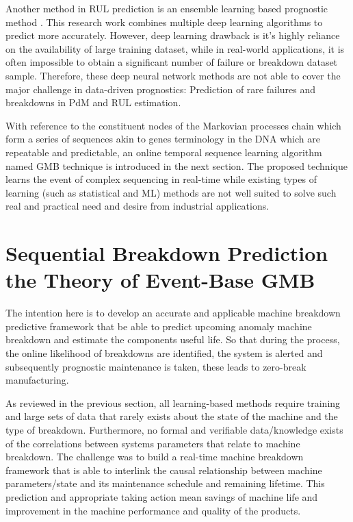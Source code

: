 \documentclass[conference]{IEEEtran}
\begin{document}
Another method in RUL prediction is an ensemble learning based prognostic method \cite{Li2019b}. This research work combines multiple deep learning algorithms to predict more accurately.  However, deep learning drawback is it’s highly reliance on the availability of large training dataset, while in real-world applications, it is often impossible to obtain a significant number of failure or breakdown dataset sample. Therefore, these deep neural network methods are not able to cover the major challenge in data-driven prognostics: Prediction of rare failures and breakdowns in PdM and RUL estimation. 

With reference to the constituent nodes of the Markovian processes chain which form a series of sequences akin to genes terminology in the DNA which are repeatable and predictable, an online temporal sequence learning algorithm named GMB technique is introduced in the next section. The proposed technique learns the event of complex sequencing in real-time while existing types of learning (such as statistical and ML) methods are not well suited to solve such real and practical need and desire from industrial applications.

\section{Sequential Breakdown Prediction the Theory of Event-Base GMB}
\label{sec:GMB}
The intention here is to develop an accurate and applicable machine breakdown predictive framework that be able to predict upcoming anomaly machine breakdown and estimate the components useful life. So that during the process, the online likelihood of breakdowns are identified, the system is alerted and subsequently prognostic maintenance is taken, these leads to zero-break manufacturing.

As reviewed in the previous section, all learning-based methods require training and large sets of data that rarely exists about the state of the machine and the type of breakdown. Furthermore, no formal and verifiable data/knowledge exists of the correlations between systems parameters that relate to machine breakdown. The challenge was to build a real-time machine breakdown framework that is able to interlink the causal relationship between machine parameters/state and its maintenance schedule and remaining lifetime. This prediction and appropriate taking action mean savings of machine life and improvement in the machine performance and quality of the products.
\end{document}
